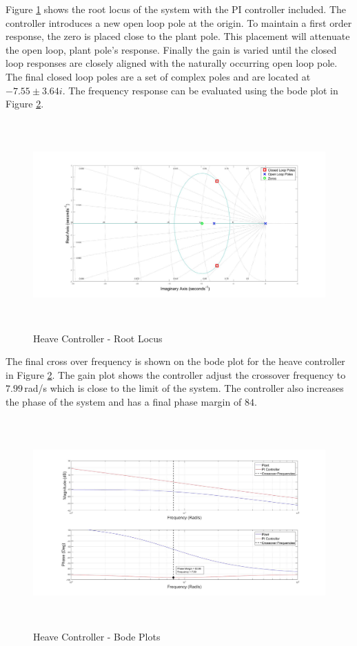 \documentclass[12pt]{report}
\begin{document}
Figure \ref{IM_HeaveControlRoot} shows the root locus of the system with the PI controller included. The controller introduces a new open loop pole at the origin. To maintain a first order response, the zero is placed close to the plant pole. This placement will attenuate the open loop, plant pole's response. Finally the gain is varied until the closed loop responses are closely aligned with the naturally occurring open loop pole. The final closed loop poles are a set of complex poles and are located at $-7.55 \pm 3.64 i$. The frequency response can be evaluated using the bode plot in Figure \ref{IM_HeaveControlBode}. 

\begin{figure}[H]
	\centering
	\includegraphics[height = 8cm]{../Design/Matlab/Controllers/heave_root.jpg}
	\caption{Heave Controller -  Root Locus}
	\label{IM_HeaveControlRoot}
\end{figure}

The final cross over frequency is shown on the bode plot for the heave controller in Figure \ref{IM_HeaveControlBode}. The gain plot shows the controller adjust the crossover frequency to $7.99$\,rad/s which is close to the limit of the system. The controller also increases the phase of the system and has a final phase margin of $84$\textdegree.

\begin{figure}[H]
	\centering
	\includegraphics[height = 8cm]{../Design/Matlab/Controllers/heave_bode.jpg}
	\caption{Heave Controller -  Bode Plots}
	\label{IM_HeaveControlBode}
\end{figure}
\end{document}
